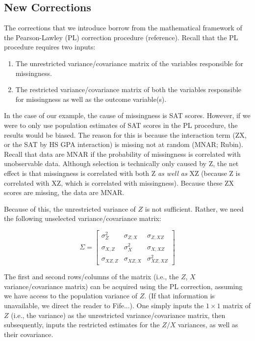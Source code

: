 \documentclass[doc, babel,english]{apa}%
\begin{document}
\subsection{New Corrections}

The corrections that we introduce borrow from the mathematical framework of the Pearson-Lawley (PL) correction procedure (reference). Recall that the PL procedure requires two inputs:

\begin{enumerate}
\item The unrestricted variance/covariance matrix of the variables responsible for missingness.
\item The restricted variance/covariance matrix of both the variables responsible for missingness as well as the outcome variable(s). 
\end{enumerate}

In the case of our example, the cause of missingness is SAT scores. However, if we were to only use population estimates of SAT scores in the PL procedure, the results would be biased. The reason for this is because the interaction term (ZX, or the SAT by HS GPA interaction) is missing not at random (MNAR; Rubin). Recall that data are MNAR if the probability of missingness is correlated with unobservable data. Although selection is technically only caused by Z, the net effect is that missingness is correlated with both Z \emph{as well as} XZ (because Z is correlated with XZ, which is correlated with missingness). Because these ZX scores are missing, the data are MNAR. 

Because of this, the unrestricted variance of $Z$ is not sufficient. Rather, we need the following unselected variance/covariance matrix:


 \[
   \Sigma=
  \left[ {\begin{array}{ccc}
   \sigma^2_Z & \sigma_{Z,X} & \sigma_{Z,XZ} \\
	\sigma_{X,Z} & \sigma^2_X & \sigma_{X,XZ} \\
	\sigma_{XZ,Z} &\sigma_{XZ,X} & \sigma^2_{XZ,XZ}
  \end{array} } \right]
\]
\label{eq:matrix}


The first and second rows/columns of the matrix (i.e., the $Z$, $X$ variance/covariance matrix) can be acquired using the PL correction, assuming we have access to the population variance of $Z$. (If that information is unavailable, we direct the reader to Fife...). One simply inputs the $1\times1$ matrix of $Z$ (i.e., the variance) as the unrestricted variance/covariance matrix, then subsequently, inputs the restricted estimates for the $Z/X$ variances, as well as their covariance. 
\end{document}
